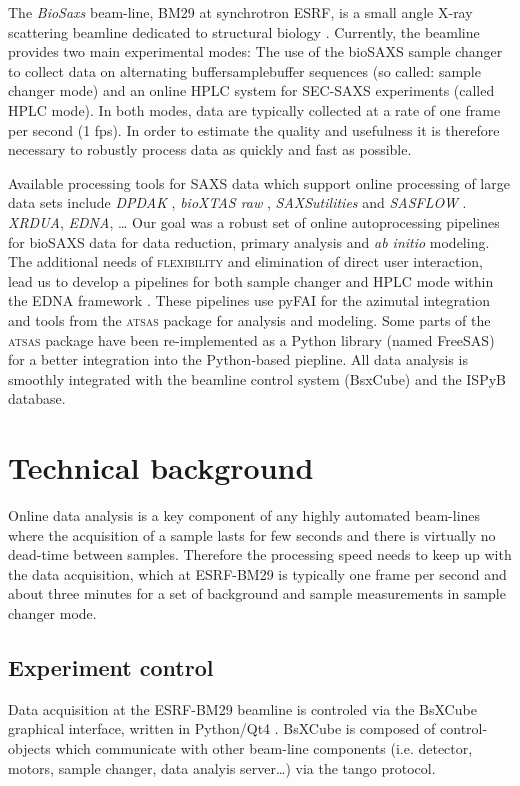 \documentclass[preprint,pdf]{iucr}              %
\begin{document}
The \textit{BioSaxs} beam-line, BM29 at synchrotron ESRF, is a small angle X-ray
scattering beamline dedicated to structural biology \cite{BM29paper}.
Currently, the beamline provides two main experimental modes: The use of the
bioSAXS sample changer to collect data on alternating buffer\/sample\/buffer
sequences (so called: sample changer mode) and an online HPLC system for
SEC-SAXS experiments (called HPLC mode).
In both modes, data are typically collected at a rate of one frame per second
(1 fps).
In order to estimate the quality and usefulness it is therefore necessary to
robustly process data as quickly and fast as possible.

Available processing tools for SAXS data which support online processing of
large data sets include \textit{DPDAK} \cite{DPDAK}, \textit{bioXTAS raw}
\cite{BioXTASraw}, \textit{SAXSutilities} \cite{SAXSUtilities} and
\textit{SASFLOW} \cite{X33P,P12}.  \textit{XRDUA}, \textit{EDNA}, \ldots
Our goal was a robust set of online autoprocessing pipelines for bioSAXS data
for data reduction, primary analysis and \textit{ab initio} modeling.
The additional needs of \textsc{flexibility} and elimination of
direct user interaction, lead us to develop a pipelines for both sample changer and HPLC mode within the
EDNA framework \cite{edna}.
These pipelines use pyFAI for the azimutal integration \cite{pyFAI} and tools
from the \textsc{atsas} package \cite{ATSAS1, ATSAS2} for analysis and modeling.
Some parts of the \textsc{atsas} package have been re-implemented as a Python
library (named FreeSAS) for a better integration into the Python-based piepline. 
All data analysis is smoothly integrated with the beamline control system
(BsxCube) and the ISPyB database.

\section{Technical background}

Online data analysis is a key component of any highly automated beam-lines
where the acquisition of a sample lasts for few seconds and there is
virtually no dead-time between samples.
Therefore the processing speed needs to keep up with the data acquisition, which
at ESRF-BM29 is typically one frame per second and about three minutes for a set
of background and sample measurements in sample changer mode.


\subsection{Experiment control}
Data acquisition at the ESRF-BM29 beamline is controled via the BsXCube
graphical interface, written in Python/Qt4 \cite{pyqt}.
BsXCube is composed of control-objects which communicate with other beam-line
components (i.e. detector, motors, sample changer, data analyis server\ldots)
via the tango protocol\cite{tango}.
\end{document}
